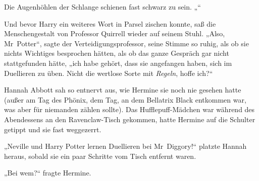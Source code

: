 Die Augenhöhlen der Schlange schienen fast schwarz zu sein. „“

Und bevor Harry ein weiteres Wort in Parsel zischen konnte, saß die Menschengestalt von Professor Quirrell wieder auf seinem Stuhl.
„Also, Mr~Potter“, sagte der Verteidigungsprofessor, seine Stimme so ruhig, als ob sie nichts Wichtiges besprochen hätten, als ob das ganze Gespräch gar nicht stattgefunden hätte, „ich habe gehört, dass sie angefangen haben, sich im Duellieren zu üben. Nicht die wertlose Sorte mit \emph{Regeln}, hoffe ich?“

\later

Hannah Abbott sah so entnervt aus, wie Hermine sie noch nie gesehen hatte (außer am Tag des Phönix, dem Tag, an dem Bellatrix Black entkommen war, was aber für niemanden zählen sollte). Das Hufflepuff-Mädchen war während des Abendessens an den Ravenclaw-Tisch gekommen, hatte Hermine auf die Schulter getippt und sie fast weggezerrt.

„Neville und Harry Potter lernen Duellieren bei Mr~Diggory!“ platzte Hannah heraus, sobald sie ein paar Schritte vom Tisch entfernt waren.

„Bei wem?“ fragte Hermine.


